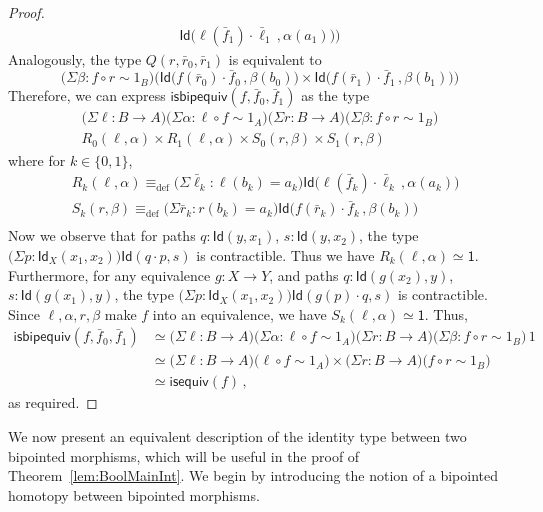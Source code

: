 \documentclass[10pt,a4paper,oneside,reqno]{amsart}
\numberwithin{equation}{section}
\theoremstyle{mythm}
\theoremstyle{mydef}
\theoremstyle{myrmk}
\newcommand{\deq}{\equiv}
\newcommand{\defeq}{\deq_{\mathrm{def}}}
\newcommand{\co}{\colon}
\newcommand{\comp}{\circ}
\newcommand{\isequiv}{\mathsf{isequiv}}
\newcommand{\ct}{\cdot}
\newcommand{\Id}{\mathsf{Id}}
\newcommand{\one}{\mathsf{1}}
\newcommand{\isbipequiv}{\mathsf{isbipequiv}}
\begin{document}
\begin{proof}
\begin{align*}
\Id \big( \ell(\bar{f}_1) \ct \bar{\ell}_1 \, ,  \alpha(a_1) \big)
\Big)
\end{align*}
Analogously, the type $Q(r,\bar{r}_0,\bar{r}_1)$ is equivalent to
\[
\big(\Sigma \beta : f \comp r \sim 1_B \big) 
\Big(
\Id  \big( f (\bar{r}_0) \ct \bar{f}_0 \, ,  \beta(b_0) \big) 
\times 
\Id \big( f(\bar{r}_1) \ct \bar{f}_1 \, ,  \beta(b_1) \big)
\Big)
\]
Therefore, we can express $\isbipequiv(f, \bar{f}_0, \bar{f}_1)$ as the type
\begin{multline*}
 \big(\Sigma \ell \co B \to  A \big) \big(\Sigma \alpha : \ell \comp f \sim 1_A \big)
  \big(\Sigma r \co B \to A \big) \big(\Sigma \beta : f \comp r \sim 1_B \big) \\
	R_0(\ell,\alpha) \times R_1(\ell,\alpha) \times S_0(r,\beta) \times S_1(r,\beta)
\end{multline*}
where for $k \in \{0,1\}$,
\begin{align*}
& R_k(\ell,\alpha) \defeq \big(\Sigma \bar{\ell}_k : \ell(b_k)=a_k \big) \Id \big( \ell (\bar{f}_k) \ct \bar{\ell}_k \, ,  \alpha(a_k) \big) \\
& S_k(r,\beta) \defeq \big(\Sigma \bar{r}_k : r(b_k)=a_k \big) \Id \big( f (\bar{r}_k) \ct \bar{f}_k \, ,  \beta(b_k) \big) \\
\end{align*}
Now we observe that for paths $q : \Id(y,x_1)$, $s : \Id(y,x_2)$, the type $\big(\Sigma p : \Id_X(x_1,x_2)\big) \Id(q \ct p,s)$ is contractible. Thus we have $R_k(\ell,\alpha) \simeq \one$.
Furthermore, for any equivalence $g : X \to Y$, and paths $q : \Id(g(x_2),y)$, $s : \Id(g(x_1),y)$, the type $\big(\Sigma p : \Id_X(x_1,x_2)\big) \Id(g(p) \ct q,s)$ is contractible. Since $\ell, \alpha, r, \beta$ make $f$ into an equivalence, we have $S_k(\ell,\alpha) \simeq \one$. Thus,
\begin{align*} 
\isbipequiv(f,\bar{f}_0, \bar{f}_1) 
  & \simeq   \big(\Sigma \ell \co B \to A \big) \big(\Sigma \alpha : \ell \comp f \sim 1_A \big) \big(\Sigma r  \co B \to A \big) 
 \big(\Sigma \beta \co f \comp r \sim 1_B \big) \, 1 \\
 & \simeq \big(\Sigma \ell \co B \to A \big)  \big( \ell \comp f \sim 1_A \big) \times 
 \big(\Sigma r  \co B \to A \big) \big( f \comp r \sim 1_B \big) \\
 & \simeq \isequiv(f) \, ,
\end{align*} 
as required.
\end{proof}



We now present an equivalent description of the identity type between two bipointed morphisms, which 
will be useful in the proof of Theorem~\ref{lem:BoolMainInt}. We begin by introducing the notion of a bipointed homotopy between bipointed morphisms.
\end{document}
